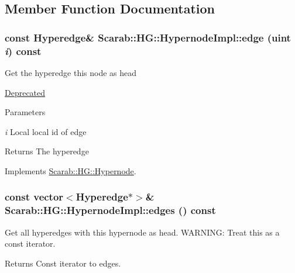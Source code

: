 \subsection{Member Function Documentation}
\hypertarget{classScarab_1_1HG_1_1HypernodeImpl_a328189f28a4185d435035686a27592c2}{
\subsubsection[{edge}]{\setlength{\rightskip}{0pt plus 5cm}const {\bf Hyperedge}\& Scarab::HG::HypernodeImpl::edge (uint {\em i}) const}}
\label{classScarab_1_1HG_1_1HypernodeImpl_a328189f28a4185d435035686a27592c2}
Get the hyperedge this node as head \begin{Desc}
\item[\hyperlink{deprecated__deprecated000009}{Deprecated}]\end{Desc}

\begin{DoxyParams}{Parameters}
\item[{\em i}]Local local id of edge\end{DoxyParams}
\begin{DoxyReturn}{Returns}
The hyperedge 
\end{DoxyReturn}


Implements \hyperlink{classScarab_1_1HG_1_1Hypernode_a3bface6832eb54a00d90e4fe8d1999f7}{Scarab::HG::Hypernode}.

\hypertarget{classScarab_1_1HG_1_1HypernodeImpl_ada979dcddc1bf0abf0fc2530d1ea8761}{
\subsubsection[{edges}]{\setlength{\rightskip}{0pt plus 5cm}const vector$<${\bf Hyperedge}$\ast$$>$\& Scarab::HG::HypernodeImpl::edges () const}}
\label{classScarab_1_1HG_1_1HypernodeImpl_ada979dcddc1bf0abf0fc2530d1ea8761}
Get all hyperedges with this hypernode as head. WARNING: Treat this as a const iterator. \begin{DoxyReturn}{Returns}
Const iterator to edges. 
\end{DoxyReturn}



